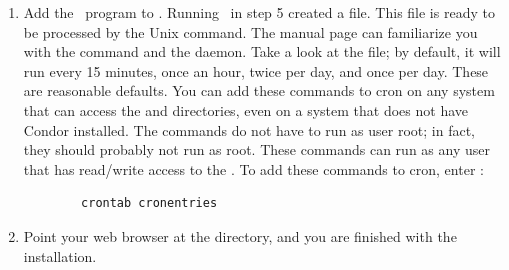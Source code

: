 \begin{enumerate}
\item Add the \MakeStats\ program to .  
Running \MakeStats\ in step 5 created a  file.
This  file is ready to be processed by the Unix
 command.
The  manual page can familiarize you
with
the  command and the  daemon.
Take a look at the
 file; by default, it will run 
 every 15 minutes, 
 once an hour, 
 twice per day, and 
 once per day.
These are reasonable defaults.  
You can add these commands to cron on any
system that can access the  and
 directories,
even on a system that does not have Condor
installed.  The commands do not have to run as user root; in
fact, they should probably not run as root.  These commands can run
as any user that has read/write access to the .
To add these
commands to cron, enter : 
\begin{verbatim} 
        crontab cronentries
\end{verbatim}

\item Point your web browser at the  directory,
and you are finished with the installation.

\end{enumerate}

